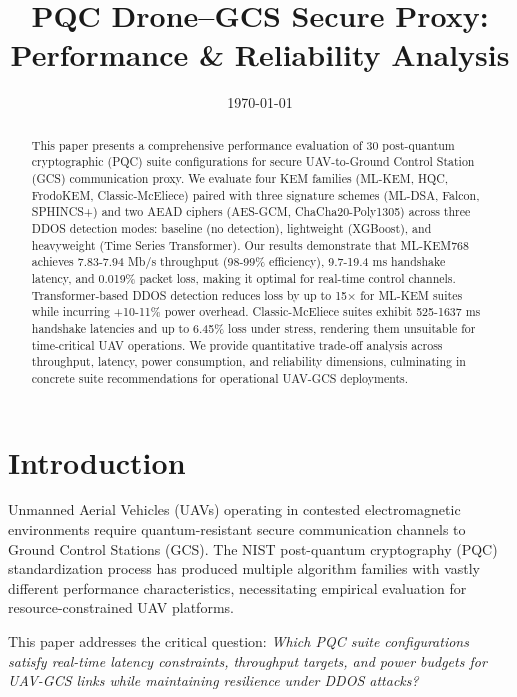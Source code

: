 \documentclass[11pt,a4paper]{article}
\title{PQC Drone--GCS Secure Proxy:\\Performance \& Reliability Analysis}
\author{}
\date{\today}
\begin{document}
\maketitle

\begin{abstract}
This paper presents a comprehensive performance evaluation of 30 post-quantum cryptographic (PQC) suite configurations for secure UAV-to-Ground Control Station (GCS) communication proxy. We evaluate four KEM families (ML-KEM, HQC, FrodoKEM, Classic-McEliece) paired with three signature schemes (ML-DSA, Falcon, SPHINCS+) and two AEAD ciphers (AES-GCM, ChaCha20-Poly1305) across three DDOS detection modes: baseline (no detection), lightweight (XGBoost), and heavyweight (Time Series Transformer). Our results demonstrate that ML-KEM768 achieves 7.83-7.94 Mb/s throughput (98-99\% efficiency), 9.7-19.4 ms handshake latency, and 0.019\% packet loss, making it optimal for real-time control channels. Transformer-based DDOS detection reduces loss by up to 15× for ML-KEM suites while incurring +10-11\% power overhead. Classic-McEliece suites exhibit 525-1637 ms handshake latencies and up to 6.45\% loss under stress, rendering them unsuitable for time-critical UAV operations. We provide quantitative trade-off analysis across throughput, latency, power consumption, and reliability dimensions, culminating in concrete suite recommendations for operational UAV-GCS deployments.
\end{abstract}

\section{Introduction}

Unmanned Aerial Vehicles (UAVs) operating in contested electromagnetic environments require quantum-resistant secure communication channels to Ground Control Stations (GCS). The NIST post-quantum cryptography (PQC) standardization process has produced multiple algorithm families with vastly different performance characteristics, necessitating empirical evaluation for resource-constrained UAV platforms.

This paper addresses the critical question: \textit{Which PQC suite configurations satisfy real-time latency constraints, throughput targets, and power budgets for UAV-GCS links while maintaining resilience under DDOS attacks?}
\end{document}
